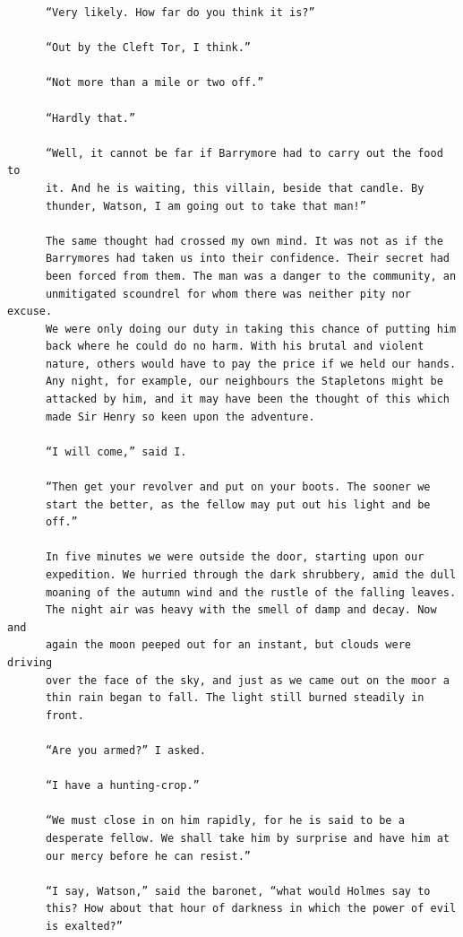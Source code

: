 \documentclass{article}
\begin{document}
\begin{verbatim}
      “Very likely. How far do you think it is?”

      “Out by the Cleft Tor, I think.”

      “Not more than a mile or two off.”

      “Hardly that.”

      “Well, it cannot be far if Barrymore had to carry out the food to
      it. And he is waiting, this villain, beside that candle. By
      thunder, Watson, I am going out to take that man!”

      The same thought had crossed my own mind. It was not as if the
      Barrymores had taken us into their confidence. Their secret had
      been forced from them. The man was a danger to the community, an
      unmitigated scoundrel for whom there was neither pity nor excuse.
      We were only doing our duty in taking this chance of putting him
      back where he could do no harm. With his brutal and violent
      nature, others would have to pay the price if we held our hands.
      Any night, for example, our neighbours the Stapletons might be
      attacked by him, and it may have been the thought of this which
      made Sir Henry so keen upon the adventure.

      “I will come,” said I.

      “Then get your revolver and put on your boots. The sooner we
      start the better, as the fellow may put out his light and be
      off.”

      In five minutes we were outside the door, starting upon our
      expedition. We hurried through the dark shrubbery, amid the dull
      moaning of the autumn wind and the rustle of the falling leaves.
      The night air was heavy with the smell of damp and decay. Now and
      again the moon peeped out for an instant, but clouds were driving
      over the face of the sky, and just as we came out on the moor a
      thin rain began to fall. The light still burned steadily in
      front.

      “Are you armed?” I asked.

      “I have a hunting-crop.”

      “We must close in on him rapidly, for he is said to be a
      desperate fellow. We shall take him by surprise and have him at
      our mercy before he can resist.”

      “I say, Watson,” said the baronet, “what would Holmes say to
      this? How about that hour of darkness in which the power of evil
      is exalted?”


\end{verbatim}
\end{document}
